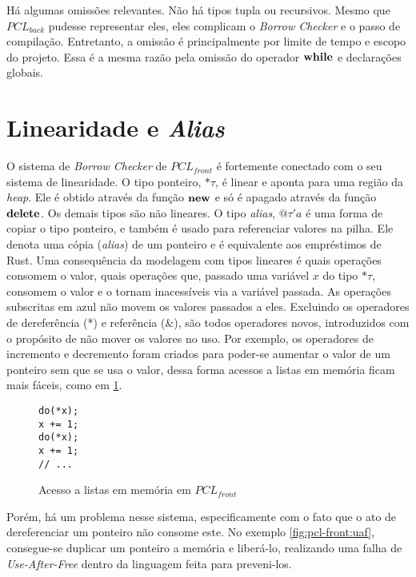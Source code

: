 Há algumas omissões relevantes. Não há tipos tupla ou recursivos. Mesmo que $PCL_{back}$ pudesse representar eles, eles complicam o \emph{Borrow Checker} e o passo de compilação. Entretanto, a omissão é principalmente por limite de tempo e escopo do projeto. Essa é a mesma razão pela omissão do operador $\mathbf{while}$ e declarações globais.

\section{Linearidade e \emph{Alias}}

O sistema de \emph{Borrow Checker} de $PCL_{front}$ é fortemente conectado com o seu sistema de linearidade. O tipo ponteiro, $\text{*}\!\tau$, é linear e aponta para uma região da \emph{heap}. Ele é obtido através da função $\mathbf{new}$ e só é apagado através da função $\mathbf{delete}$. Os demais tipos são não lineares. O tipo \emph{alias}, $@\tau'a$ é uma forma de copiar o tipo ponteiro, e também é usado para referenciar valores na pilha. Ele denota uma cópia (\emph{alias}) de um ponteiro e é equivalente aos empréstimos de Rust. Uma consequência da modelagem com tipos lineares é quais operações consomem o valor, quais operações que, passado uma variável $x$ do tipo $\text{*}\!\tau$, consomem o valor e o tornam inacessíveis via a variável passada. As operações subscritas em {\color{blue}azul} não movem os valores passados a eles. Excluindo os operadores de dereferência (*) e referência (\&), são todos operadores novos, introduzidos com o propósito de não mover os valores no uso. Por exemplo, os operadores de incremento e decremento foram criados para poder-se aumentar o valor de um ponteiro sem que se usa o valor, dessa forma acessos a listas em memória ficam mais fáceis, como em \ref{fig:pcl-front:inc}.

\begin{figure}[ht]
	\caption{Acesso a listas em memória em $PCL_{front}$}
	\label{fig:pcl-front:inc}
	\begin{lstlisting}[language=PCLfront]
do(*x);
x += 1;
do(*x);
x += 1;
// ...
	\end{lstlisting}
\end{figure}

Porém, há um problema nesse sistema, especificamente com o fato que o ato de dereferenciar um ponteiro não consome este. No exemplo \ref{fig:pcl-front:uaf}, consegue-se duplicar um ponteiro a memória e liberá-lo, realizando uma falha de \emph{Use-After-Free} dentro da linguagem feita para preveni-los.

